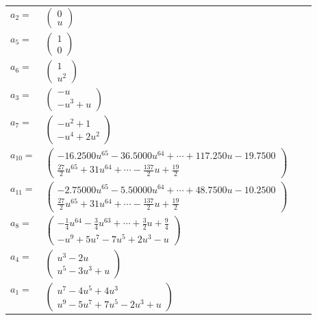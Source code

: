 \documentclass[1p]{elsarticle_modified}
\theoremstyle{definition}
\begin{document}
\begin{tabular}{m{7pt} m{180pt} m{7pt} m{180pt} }
\flushright $a_{2}=$&$\begin{pmatrix}0\\u\end{pmatrix}$ \\
\flushright $a_{5}=$&$\begin{pmatrix}1\\0\end{pmatrix}$ \\
\flushright $a_{6}=$&$\begin{pmatrix}1\\u^2\end{pmatrix}$ \\
\flushright $a_{3}=$&$\begin{pmatrix}- u\\- u^3+u\end{pmatrix}$ \\
\flushright $a_{7}=$&$\begin{pmatrix}- u^2+1\\- u^4+2 u^2\end{pmatrix}$ \\
\flushright $a_{10}=$&$\begin{pmatrix}-16.2500 u^{65}-36.5000 u^{64}+\cdots+117.250 u-19.7500\\\frac{27}{2} u^{65}+31 u^{64}+\cdots-\frac{137}{2} u+\frac{19}{2}\end{pmatrix}$ \\
\flushright $a_{11}=$&$\begin{pmatrix}-2.75000 u^{65}-5.50000 u^{64}+\cdots+48.7500 u-10.2500\\\frac{27}{2} u^{65}+31 u^{64}+\cdots-\frac{137}{2} u+\frac{19}{2}\end{pmatrix}$ \\
\flushright $a_{8}=$&$\begin{pmatrix}-\frac{1}{4} u^{64}-\frac{3}{4} u^{63}+\cdots+\frac{3}{2} u+\frac{9}{4}\\- u^9+5 u^7-7 u^5+2 u^3- u\end{pmatrix}$ \\
\flushright $a_{4}=$&$\begin{pmatrix}u^3-2 u\\u^5-3 u^3+u\end{pmatrix}$ \\
\flushright $a_{1}=$&$\begin{pmatrix}u^7-4 u^5+4 u^3\\u^9-5 u^7+7 u^5-2 u^3+u\end{pmatrix}$ \\

\end{tabular}
\end{document}
